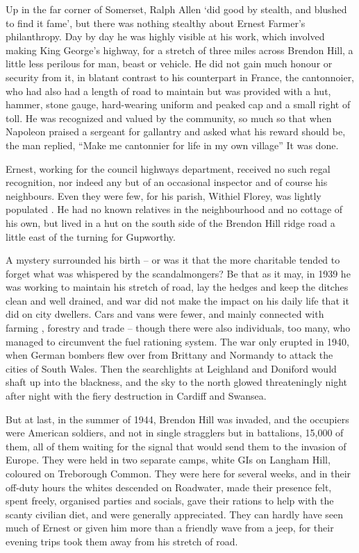 
Up in the far corner of Somerset, Ralph Allen ‘did good by stealth, and blushed to find it fame’, but there was nothing stealthy about Ernest Farmer’s philanthropy. Day by day he was highly visible at his work, which involved making King George’s highway, for a stretch of three miles across Brendon Hill, a little less perilous for man, beast or vehicle. He did not gain much honour or security from it, in blatant contrast to his counterpart in France, the cantonnoier, who had also had a length of road to maintain but was provided with a hut, hammer, stone gauge, hard-wearing uniform and peaked cap and a small right of toll. He was recognized and valued by the community, so much so that when Napoleon praised a sergeant for gallantry and asked what his reward should be, the man replied, “Make me cantonnier for life in my own village” It was done. 

Ernest, working for the council highways department, received no such regal recognition, nor indeed any but of an occasional inspector and of course his neighbours. Even they were few, for his parish, Withiel Florey, was lightly populated . He had no known relatives in the neighbourhood and no cottage of his own, but lived in a hut on the south side of the Brendon Hill ridge road a little east of the turning for Gupworthy. 

A mystery surrounded his birth – or was it that the more charitable tended to forget what was whispered by the scandalmongers? Be that as it may, in 1939 he was working to maintain his stretch of road, lay the hedges and keep the ditches clean and well drained, and war did not make the impact on his daily life that it did on city dwellers. Cars and vans were fewer, and mainly connected with farming , forestry and trade – though there were also individuals, too many, who managed to circumvent the fuel rationing system. The war only erupted in 1940, when German bombers flew over from Brittany and Normandy to attack the cities of South Wales. Then the searchlights at Leighland and Doniford would shaft up into the blackness, and the sky to the north glowed threateningly night after night with the fiery destruction in Cardiff and Swansea.

But at last, in the summer of 1944, Brendon Hill was invaded, and the occupiers were American soldiers, and not in single stragglers but in battalions, 15,000 of them, all of them waiting for the signal that would send them to the invasion of Europe. They were held in two separate camps, white GIs on Langham Hill, coloured on Treborough Common. They were here for several weeks, and in their off-duty hours the whites descended on Roadwater, made their presence felt, spent freely, organised parties and socials, gave their rations to help with the scanty civilian diet, and were generally appreciated. They can hardly have seen much of Ernest or given him more than a friendly wave from a jeep, for their evening trips took them away from his stretch of road. 

